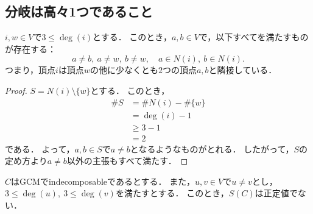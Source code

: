 \subsection{分岐は高々1つであること}

\begin{lemma}
  \label{lem:exist_two_extra_neighbors}
  \leanok
  \uses{}
  $i, w \in V$で$3 \le \deg(i)$とする．
  このとき，$a, b \in V$で，以下すべてを満たすものが存在する：
  \begin{equation}
    a \ne b,\ a \ne w,\ b \ne w,\quad a \in N(i),\ b \in N(i).
  \end{equation}
  つまり，頂点$i$は頂点$w$の他に少なくとも$2$つの頂点$a, b$と隣接している．
\end{lemma}

\begin{proof}
  $S = N(i) \setminus\{w\}$とする．
  このとき，
  \begin{align}
    \# S
    &= \# N(i) - \# \{w\} \\
    &= \deg(i) - 1 \\
    &\ge 3 - 1 \\
    &= 2
  \end{align}
  である．
  よって，$a, b \in S$で$a \ne b$となるようなものがとれる．
  したがって，$S$の定め方より$a \ne b$以外の主張もすべて満たす．
\end{proof}

\begin{lemma}
  \label{lem:not_posDef_of_two_branches}
  \leanok
  $C$はGCMでindecomposableであるとする．
  また，$u, v \in V$で$u \ne v$とし，$3 \le \deg(u),\ 3 \le \deg(v)$を満たすとする．
  このとき，$S(C)$は正定値でない．
\end{lemma}

